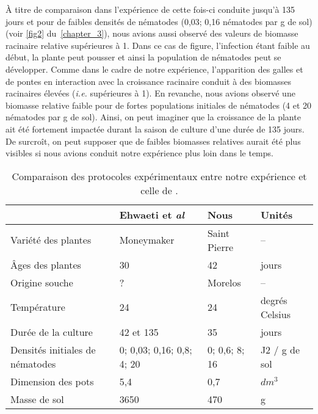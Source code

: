 	 À titre de comparaison
	dans l'expérience de \citet{Ehwaeti1998} cette fois-ci conduite  jusqu'à 135 jours et pour de faibles densités de nématodes  (0,03; 0,16  nématodes par g de sol) (voir \autoref{fig2} du~\autoref{chapter_3}), nous avions aussi observé des valeurs de biomasse racinaire relative supérieures à 1. Dans ce cas de figure,
l'infection étant faible au début, la plante peut pousser  et ainsi la population de nématodes peut se développer. Comme dans le cadre de notre expérience, l'apparition des galles et de pontes en interaction avec la croissance racinaire conduit à des biomasses racinaires élevées (\textit{i.e.} supérieures à 1).  En revanche, nous avions observé une biomasse relative faible pour de fortes populations initiales de nématodes (4 et 20 nématodes par g de sol). Ainsi, on peut imaginer que la croissance de la plante ait été fortement impactée durant la saison de culture d'une durée de 135 jours. De surcroît, on peut supposer que de faibles biomasses relatives  aurait été plus visibles si nous avions conduit notre expérience plus loin dans le temps.
	
			
	
	\begin{table}[ht]
	  \centering
	      \small
	  {\renewcommand{\arraystretch}{1.2}
	  \caption{Comparaison des protocoles expérimentaux entre  notre expérience  et celle de  \citet{Ehwaeti1998} . }
	
	  \begin{tabular}{llll}
	\hline
	                      &  Ehwaeti et \textit{al} & Nous            & Unités \\ \hline
	Variété des plantes & Moneymaker & Saint Pierre & --\\
	Âges des plantes    & 30                                          & 42 & jours                      \\
	Origine souche      & ?                                           & Morelos &  --                    \\
	Température         & 24          & 24  & degrés Celsius                     \\ 
	Durée de la culture & 42 et 135                                   & 35 & jours                      \\ 
	Densités initiales de nématodes  & 0; 0,03; 0,16; 0,8; 4; 20  &  0; 0,6; 8; 16  & J2 / g de sol \\
	Dimension des pots    & 5,4                                       & 0,7                     & $dm^3$ \\ 
	Masse de sol          & 3650                                      & 470 & g \\ \hline
	\end{tabular}
	
	\label{tab:comp:exp}}
	\end{table}
		

